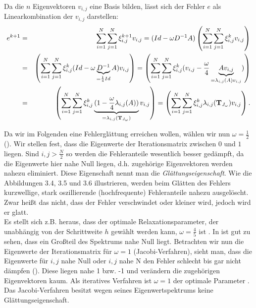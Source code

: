 
Da die $n$ Eigenvektoren $v_{i,j}$ eine Basis bilden, lässt sich der Fehler $e$ als Linearkombination der $v_{i,j}$ darstellen:
\begin{eqnarray}
e^{k+1} &=& \sum_{i = 1}^{N} \sum_{j = 1}^{N} \xi^{k+1}_{i,j} v_{i,j} = (Id - \omega D^{-1}A) \left(\sum_{i = 1}^{N} \sum_{j = 1}^{N} \xi^{k}_{i,j} v_{i,j}\right) \notag \\
&=& \left(\sum_{i = 1}^{N} \sum_{j = 1}^{N} \xi^{k}_{i,j} (Id - \omega \underbrace{D^{-1}}_{=\frac{1}{4} Id} A) v_{i,j}\right) = \left(\sum_{i = 1}^{N} \sum_{j = 1}^{N} \xi^{k}_{i,j} (v_{i,j} - \frac {\omega} {4} \underbrace{A v_{i,j}}_{= \lambda_{i,j}(A)v_{i,j}})\right) \notag \\
&=& \left(\sum_{i = 1}^{N} \sum_{j = 1}^{N} \xi^{k}_{i,j} \underbrace{(1 - \frac {\omega} {4} \lambda_{i,j}(A))}_{= \lambda_{i,j}({\textbf{T}}_{J_{\omega}})} v_{i,j}\right) = \left(\sum_{i = 1}^{N} \sum_{j = 1}^{N} \xi^{k}_{i,j} \lambda_{i,j}({\textbf{T}}_{J_{\omega}}) v_{i,j}\right).
\end{eqnarray}

\label{img.Jacobi2}

Da wir im Folgenden eine Fehlerglättung erreichen wollen, wählen wir nun $\omega = \frac {1} {2}$ (). Wir stellen fest, dass die Eigenwerte der Iterationsmatrix zwischen $0$ und $1$ liegen. Sind $i,j > \frac {N} {2}$ so werden die Fehleranteile wesentlich besser gedämpft, da die Eigenwerte hier nahe Null liegen, d.h. zugehörige Eigenvektoren werden nahezu eliminiert. Diese Eigenschaft nennt man die \textit{Glättungseigenschaft}. Wie die Abbildungen 3.4, 3.5 und 3.6 illustrieren, werden beim Glätten des Fehlers kurzwellige, stark oszillierende (hochfrequente) Fehleranteile nahezu ausgelöscht. Zwar heißt das nicht, dass der Fehler verschwindet oder kleiner wird, jedoch wird er glatt.\\
Es stellt sich z.B. heraus, dass der optimale Relaxationsparameter, der unabhängig von der Schrittweite $h$ gewählt werden kann, $\omega = \frac {4} {5}$ ist \cite{SAAD4}. In  ist gut zu sehen, dass ein Großteil des Spektrums nahe Null liegt.
Betrachten wir nun die Eigenwerte der Iterationsmatrix für $\omega = 1$ (Jacobi-Verfahren), sieht man, dass die Eigenwerte für $i,j$ nahe Null oder $i,j$ nahe N den Fehler schlecht bis gar nicht dämpfen (). Diese liegen nahe 1 bzw. -1 und verändern die zugehörigen Eigenvektoren kaum. Als iteratives Verfahren ist $\omega = 1$ der optimale Parameter \cite{SAAD3}. Das Jacobi-Verfahren besitzt wegen seines Eigenwertspektrums keine Glättungseigenschaft.\\

